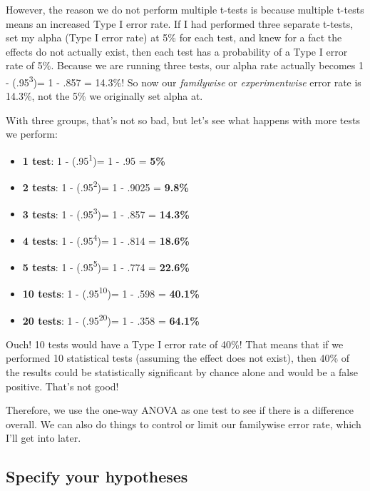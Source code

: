 \documentclass[
]{book}
\providecommand{\tightlist}{%
  \setlength{\itemsep}{0pt}\setlength{\parskip}{0pt}}
\begin{document}
However, the reason we do not perform multiple t-tests is because multiple t-tests means an increased Type I error rate. If I had performed three separate t-tests, set my alpha (Type I error rate) at 5\% for each test, and knew for a fact the effects do not actually exist, then each test has a probability of a Type I error rate of 5\%. Because we are running three tests, our alpha rate actually becomes 1 - (.95\textsuperscript{3})= 1 - .857 = 14.3\%! So now our \emph{familywise} or \emph{experimentwise} error rate is 14.3\%, not the 5\% we originally set alpha at.

With three groups, that's not so bad, but let's see what happens with more tests we perform:

\begin{itemize}
\tightlist
\item
  \textbf{1 test}: 1 - (.95\textsuperscript{1})= 1 - .95 = \textbf{5\%}
\item
  \textbf{2 tests}: 1 - (.95\textsuperscript{2})= 1 - .9025 = \textbf{9.8\%}
\item
  \textbf{3 tests}: 1 - (.95\textsuperscript{3})= 1 - .857 = \textbf{14.3\%}
\item
  \textbf{4 tests}: 1 - (.95\textsuperscript{4})= 1 - .814 = \textbf{18.6\%}
\item
  \textbf{5 tests}: 1 - (.95\textsuperscript{5})= 1 - .774 = \textbf{22.6\%}
\item
  \textbf{10 tests}: 1 - (.95\textsuperscript{10})= 1 - .598 = \textbf{40.1\%}
\item
  \textbf{20 tests}: 1 - (.95\textsuperscript{20})= 1 - .358 = \textbf{64.1\%}
\end{itemize}

Ouch! 10 tests would have a Type I error rate of 40\%! That means that if we performed 10 statistical tests (assuming the effect does not exist), then 40\% of the results could be statistically significant by chance alone and would be a false positive. That's not good!

Therefore, we use the one-way ANOVA as one test to see if there is a difference overall. We can also do things to control or limit our familywise error rate, which I'll get into later.

\hypertarget{specify-your-hypotheses-4}{%
\subsection{Specify your hypotheses}\label{specify-your-hypotheses-4}}
\end{document}
